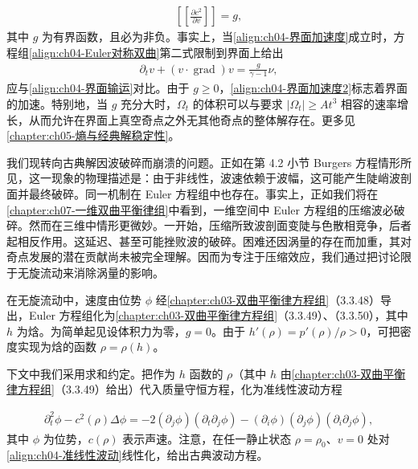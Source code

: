 ﻿\documentclass[../../main.tex]{subfiles}
\begin{document}
\begin{align}
\left[\left[\frac{\partial c^{2}}{\partial v}\right]\right]=g,
\label{align:ch04-界面加速度}
\end{align}
其中 $g$ 为有界函数，且必为非负。事实上，当\eqref{align:ch04-界面加速度}成立时，方程组\eqref{align:ch04-Euler对称双曲}第二式限制到界面上给出
\begin{align}
\partial_{t}v+(v\cdot\operatorname{grad})v=\frac{g}{\gamma-1}\nu,
\label{align:ch04-界面加速度2}
\end{align}
应与\eqref{align:ch04-界面输运}对比。由于 $g\geqslant 0$，\eqref{align:ch04-界面加速度2}标志着界面的加速。特别地，当 $g$ 充分大时，$\Omega_{t}$ 的体积可以与要求 $|\Omega_{t}|\geqslant At^{3}$ 相容的速率增长，从而允许在界面上真空奇点之外无其他奇点的整体解存在。更多见\cref{chapter:ch05-熵与经典解稳定性}。


我们现转向古典解因波破碎而崩溃的问题。正如在第 4.2 小节 Burgers 方程情形所见，这一现象的物理描述是：由于非线性，波速依赖于波幅，这可能产生陡峭波剖面并最终破碎。同一机制在 Euler 方程组中也存在。事实上，正如我们将在\cref{chapter:ch07-一维双曲平衡律组}中看到，一维空间中 Euler 方程组的压缩波必破碎。然而在三维中情形更微妙。一开始，压缩所致波剖面变陡与色散相竞争，后者起相反作用。这延迟、甚至可能挫败波的破碎。困难还因涡量的存在而加重，其对奇点发展的潜在贡献尚未被完全理解。因而为专注于压缩效应，我们通过把讨论限于无旋流动来消除涡量的影响。

在无旋流动中，速度由位势 $\phi$ 经\cref{chapter:ch03-双曲平衡律方程组}（3.3.48）导出，Euler 方程组化为\cref{chapter:ch03-双曲平衡律方程组}（3.3.49）、（3.3.50），其中 $h$ 为焓。为简单起见设体积力为零，$g=0$。由于 $h'(\rho)=p'(\rho)/\rho>0$，可把密度实现为焓的函数 $\rho=\rho(h)$。


下文中我们采用求和约定。把作为 $h$ 函数的 $\rho$（其中 $h$ 由\cref{chapter:ch03-双曲平衡律方程组}（3.3.49）给出）代入质量守恒方程，化为准线性波动方程

\begin{align}
\partial_{t}^{2}\phi-c^{2}(\rho)\Delta\phi=-2(\partial_{j}\phi)(\partial_{t}\partial_{j}\phi)-(\partial_{i}\phi)(\partial_{j}\phi)(\partial_{i}\partial_{j}\phi),
\label{align:ch04-准线性波动}
\end{align}
其中 $\phi$ 为位势，$c(\rho)$ 表示声速。注意，在任一静止状态 $\rho=\rho_{0}$、$v=0$ 处对\eqref{align:ch04-准线性波动}线性化，给出古典波动方程。
\end{document}

